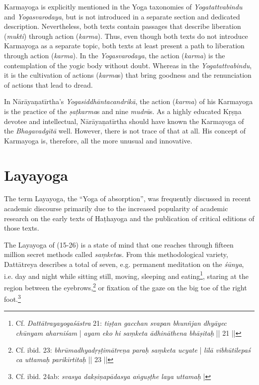 Karmayoga is explicitly mentioned in the Yoga taxonomies of \textit{Yogatattvabindu} and \textit{Yogasvarodaya}, but is not introduced in a separate section and dedicated description. Nevertheless, both texts contain passages that describe liberation (\textit{mukti}) through action (\textit{karma}). Thus, even though both texts do not introduce Karmayoga as a separate topic, both texts at least present a path to liberation through action (\textit{karma}). In the \textit{Yogasvarodaya}, the action (\textit{karma}) is the contemplation of the yogic body without doubt. Whereas in the \textit{Yogatattvabindu}, it is the cultivation of actions (\textit{karma}s) that bring goodness and the renunciation of actions that lead to dread. 

In Nārāyaṇatīrtha's \emph{Yogasiddhāntacandrikā}, the action (\textit{karma}) of his Karmayoga is the practice of the \textit{ṣaṭkarma}s and nine \textit{mudrā}s. As a highly educated Kṛṣṇa devotee and intellectual, Nārāyaṇatīrtha should have known the Karmayoga of the \emph{Bhagavadgītā} well. However, there is not trace of that at all. His concept of Karmayoga is, therefore, all the more unusual and innovative.   

\section{Layayoga}
\label{layayogaintro}

The term Layayoga, the ``Yoga of absorption'', was frequently discussed in recent academic discourse primarily due to the increased popularity of academic research on the early texts of Haṭhayoga and the publication of critical editions of those texts. 

The Layayoga of  (15-26) is a state of mind that one reaches through fifteen million secret methods called \textit{saṃketa}s. From this methodological variety, Dattātreya describes a total of seven, e.g. permanent meditation on the \textit{śūnya}, i.e. day and night while sitting still, moving, sleeping and eating\footnote{Cf. \emph{Dattātrayayogaśāstra} 21: \textit{tiṣṭan gacchan svapan bhunñjan dhyāyec chūnyam aharniśam} | \textit{ayam eko hi saṃketa ādhināthena bhāṣitaḥ} || 21 ||}, staring at the region between the eyebrows,\footnote{Cf. ibid. 23: \textit{bhrūmadhyadṛṣṭimātreṇa paraḥ saṃketa ucyate} | \textit{līlā vibhūtilepaś ca uttamaḥ parikīrtitaḥ} || 23 ||} or fixation of the gaze on the big toe of the right foot.\footnote{Cf. ibid. 24ab: \textit{svasya dakṣiṇapādasya aṅguṣṭhe laya uttamaḥ} |}

